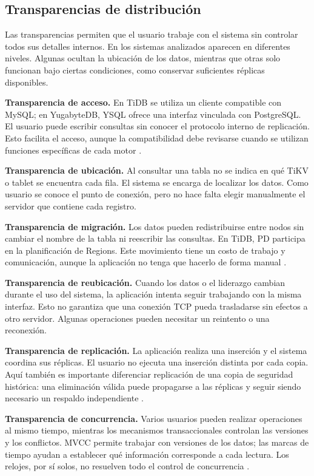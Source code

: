 \documentclass[11pt,a4paper]{article}
\begin{document}
\subsection{Transparencias de distribución}
Las transparencias permiten que el usuario trabaje con el sistema sin controlar todos sus detalles internos. En los sistemas analizados aparecen en diferentes niveles. Algunas ocultan la ubicación de los datos, mientras que otras solo funcionan bajo ciertas condiciones, como conservar suficientes réplicas disponibles.

\textbf{Transparencia de acceso.} En TiDB se utiliza un cliente compatible con MySQL; en YugabyteDB, YSQL ofrece una interfaz vinculada con PostgreSQL. El usuario puede escribir consultas sin conocer el protocolo interno de replicación. Esto facilita el acceso, aunque la compatibilidad debe revisarse cuando se utilizan funciones específicas de cada motor \cite{tidb_arch,yb_arch}.

\textbf{Transparencia de ubicación.} Al consultar una tabla no se indica en qué TiKV o tablet se encuentra cada fila. El sistema se encarga de localizar los datos. Como usuario se conoce el punto de conexión, pero no hace falta elegir manualmente el servidor que contiene cada registro.

\textbf{Transparencia de migración.} Los datos pueden redistribuirse entre nodos sin cambiar el nombre de la tabla ni reescribir las consultas. En TiDB, PD participa en la planificación de Regions. Este movimiento tiene un costo de trabajo y comunicación, aunque la aplicación no tenga que hacerlo de forma manual \cite{tidb_tikv}.

\textbf{Transparencia de reubicación.} Cuando los datos o el liderazgo cambian durante el uso del sistema, la aplicación intenta seguir trabajando con la misma interfaz. Esto no garantiza que una conexión TCP pueda trasladarse sin efectos a otro servidor. Algunas operaciones pueden necesitar un reintento o una reconexión.

\textbf{Transparencia de replicación.} La aplicación realiza una inserción y el sistema coordina sus réplicas. El usuario no ejecuta una inserción distinta por cada copia. Aquí también es importante diferenciar replicación de una copia de seguridad histórica: una eliminación válida puede propagarse a las réplicas y seguir siendo necesario un respaldo independiente \cite{tidb_storage,huang2024survey}.

\textbf{Transparencia de concurrencia.} Varios usuarios pueden realizar operaciones al mismo tiempo, mientras los mecanismos transaccionales controlan las versiones y los conflictos. MVCC permite trabajar con versiones de los datos; las marcas de tiempo ayudan a establecer qué información corresponde a cada lectura. Los relojes, por sí solos, no resuelven todo el control de concurrencia \cite{yb_tx,huang2024survey}.
\end{document}
